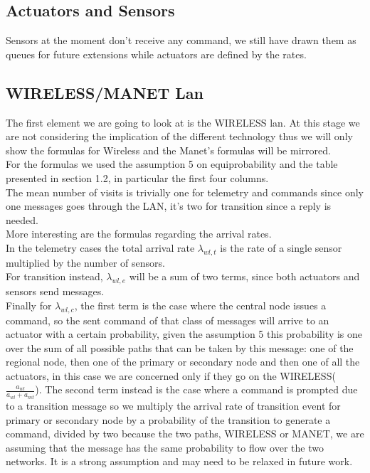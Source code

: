 \documentclass[11pt]{article}
\begin{document}
\subsection{Actuators and Sensors}
Sensors at the moment don't receive any command, we still have drawn them as queues for future extensions while actuators are defined by the rates.\\

\subsection{WIRELESS/MANET Lan}
The first element we are going to look at is the WIRELESS lan. At this stage we are not considering the implication of the different technology thus we will only show the formulas for Wireless and the Manet's formulas will be mirrored.\\
For the formulas we used the assumption 5 on equiprobability and the table presented in section 1.2, in particular the first four columns.\\
The mean number of visits is trivially one for telemetry and commands since only one messages goes through the LAN, it's two for transition since a reply is needed.\\
More interesting are the formulas regarding the arrival rates.\\
In the telemetry cases the total arrival rate $\lambda_{wl, t}$ is the rate of a single sensor multiplied by the number of sensors.\\
For transition instead, $\lambda_{wl, e}$ will be a sum of two terms, since both actuators and sensors send messages.\\
Finally for $\lambda_{wl, c}$, the first term is the case where the central node issues a command, so the sent command of that class of messages will arrive to an actuator with a certain probability, given the assumption 5 this probability is one over the sum of all possible paths that can be taken by this message: one of the regional node, then one of the primary or secondary node and then one of all the actuators, in this case we are concerned only if they go on the WIRELESS($\frac{a_{wl}}{a_{wl}+a_{mt}}$). The second term instead is the case where a command is prompted due to a transition message so we multiply the arrival rate of transition event for primary or secondary node by a probability of the transition to generate a command, divided by two because the two paths, WIRELESS or MANET, we are assuming that the message has the same probability to flow over the two networks. It is a strong assumption and may need to be relaxed in future work.\\
\end{document}
